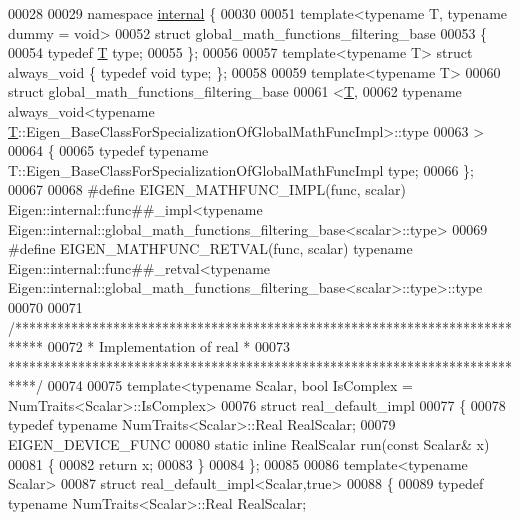 \begin{DoxyCode}
00028 
00029 \textcolor{keyword}{namespace }\hyperlink{namespaceinternal}{internal} \{
00030 
00051 \textcolor{keyword}{template}<\textcolor{keyword}{typename} T, \textcolor{keyword}{typename} dummy = \textcolor{keywordtype}{void}>
00052 \textcolor{keyword}{struct }global\_math\_functions\_filtering\_base
00053 \{
00054   \textcolor{keyword}{typedef} \hyperlink{group___sparse_core___module_class_eigen_1_1_triplet}{T} type;
00055 \};
00056 
00057 \textcolor{keyword}{template}<\textcolor{keyword}{typename} T> \textcolor{keyword}{struct }always\_void \{ \textcolor{keyword}{typedef} \textcolor{keywordtype}{void} type; \};
00058 
00059 \textcolor{keyword}{template}<\textcolor{keyword}{typename} T>
00060 \textcolor{keyword}{struct }global\_math\_functions\_filtering\_base
00061   <\hyperlink{group___sparse_core___module_class_eigen_1_1_triplet}{T},
00062    typename always\_void<typename \hyperlink{group___sparse_core___module_class_eigen_1_1_triplet}{T}::Eigen\_BaseClassForSpecializationOfGlobalMathFuncImpl>::type
00063   >
00064 \{
00065   \textcolor{keyword}{typedef} \textcolor{keyword}{typename} T::Eigen\_BaseClassForSpecializationOfGlobalMathFuncImpl type;
00066 \};
00067 
00068 \textcolor{preprocessor}{#define EIGEN\_MATHFUNC\_IMPL(func, scalar) Eigen::internal::func##\_impl<typename
       Eigen::internal::global\_math\_functions\_filtering\_base<scalar>::type>}
00069 \textcolor{preprocessor}{#define EIGEN\_MATHFUNC\_RETVAL(func, scalar) typename Eigen::internal::func##\_retval<typename
       Eigen::internal::global\_math\_functions\_filtering\_base<scalar>::type>::type}
00070 
00071 \textcolor{comment}{/****************************************************************************}
00072 \textcolor{comment}{* Implementation of real                                                 *}
00073 \textcolor{comment}{****************************************************************************/}
00074 
00075 template<typename Scalar, bool IsComplex = NumTraits<Scalar>::IsComplex>
00076 \textcolor{keyword}{struct }real\_default\_impl
00077 \{
00078   \textcolor{keyword}{typedef} \textcolor{keyword}{typename} NumTraits<Scalar>::Real RealScalar;
00079   EIGEN\_DEVICE\_FUNC
00080   \textcolor{keyword}{static} \textcolor{keyword}{inline} RealScalar run(\textcolor{keyword}{const} Scalar& x)
00081   \{
00082     \textcolor{keywordflow}{return} x;
00083   \}
00084 \};
00085 
00086 \textcolor{keyword}{template}<\textcolor{keyword}{typename} Scalar>
00087 \textcolor{keyword}{struct }real\_default\_impl<Scalar,true>
00088 \{
00089   \textcolor{keyword}{typedef} \textcolor{keyword}{typename} NumTraits<Scalar>::Real RealScalar;

\end{DoxyCode}
